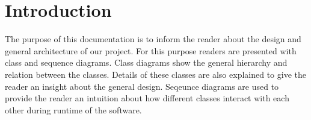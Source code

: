\section{Introduction}
The purpose of this documentation is to inform the reader about the design and general architecture of our project. For this purpose readers are presented with class and sequence diagrams. Class diagrams show the general hierarchy and relation between the classes. Details of these classes are also explained to give the reader an insight about the general design. Seqeunce diagrams are used to provide the reader an intuition about how different classes interact with each other during runtime of the software. 